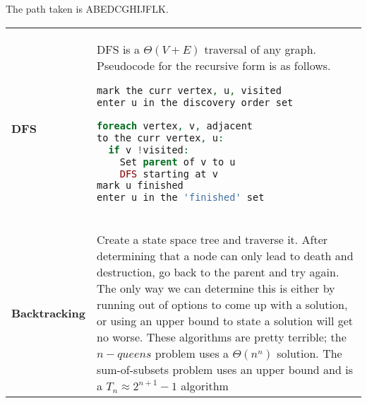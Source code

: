 \documentclass[aip, jmp, amsmath,amssymb, reprint]{revtex4-1}
\theoremstyle{definition}
\begin{document}
The path taken is ABEDCGHIJFLK.\\
    
\begin{longtable}{p{2.2cm} p{6cm} }
        \textbf{DFS} & DFS is a  $\Theta(V + E)$ traversal of any graph. Pseudocode for the recursive form is as follows.
\begin{lstlisting}[language=php]
mark the curr vertex, u, visited
enter u in the discovery order set

foreach vertex, v, adjacent 
to the curr vertex, u:
  if v !visited:
    Set parent of v to u
    DFS starting at v
mark u finished 
enter u in the 'finished' set
    
\end{lstlisting}\\
    \textbf{Backtracking} & Create a state space tree and traverse it. After determining that a node can only lead to death and destruction, go back to the parent and try again. The only way we can determine this is either by running out of options to come up with a solution, or using an upper bound to state a solution will get no worse. These algorithms are pretty terrible; the $n-queens$ problem uses a $\Theta(n^n)$ solution. The sum-of-subsets problem uses an upper bound and is a $T_n \approx 2^{n+1}-1$ algorithm
\end{longtable}
\end{document}
